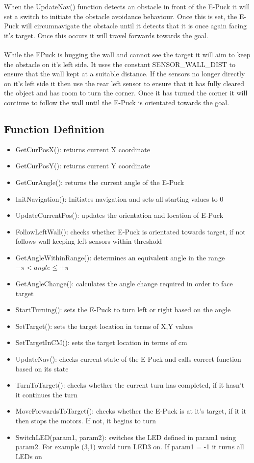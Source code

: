 \documentclass[11pt]{article}
\begin{document}
When the UpdateNav() function detects an obstacle in front of the E-Puck it will set a switch to initiate the obstacle avoidance behaviour. Once this is set, the E-Puck will circumnavigate the obstacle until it detects that it is once again facing it’s target. Once this occurs it will travel forwards towards the goal.
\\
\\
While the E\-Puck is hugging the wall and cannot see the target it will aim to keep the obstacle on it’s left side. It uses the constant SENSOR\_WALL\_DIST to ensure that the wall kept at a suitable distance. If the sensors no longer directly on it’s left side it then use the rear left sensor to ensure that it has fully cleared the object and has room to turn the corner. Once it has turned the corner it will continue to follow the wall until the E-Puck is orientated towards the goal.

\subsection*{Function Definition}

\begin{itemize}
\item{GetCurPosX(): returns current X coordinate}
\item{GetCurPosY(): returns current Y coordinate}
\item{GetCurAngle(): returns the current angle of the E-Puck}
\item{InitNavigation(): Initiates navigation and sets all starting values to 0}
\item{UpdateCurrentPos(): updates the orientation and location of E-Puck}
\item{FollowLeftWall(): checks whether E-Puck is orientated towards target, if not follows wall keeping left sensors within threshold}
\item{GetAngleWithinRange(): determines an equivalent angle in the range \begin{math}-\pi < angle \leq +\pi\end{math}}
\item{GetAngleChange(): calculates the angle change required in order to face target}
\item{StartTurning(): sets the E-Puck to turn left or right based on the angle}
\item{SetTarget(): sets the target location in terms of X,Y values}
\item{SetTargetInCM(): sets the target location in terms of cm}
\item{UpdateNav(): checks current state of the E-Puck and calls correct function based on its state}
\item{TurnToTarget(): checks whether the current turn has completed, if it hasn’t it continues the turn}
\item{MoveForwardsToTarget(): checks whether the E-Puck is at it’s target, if it it then stops the motors. If not, it begins to turn}
\item{SwitchLED(param1, param2): switches the LED defined in param1 using param2. For example (3,1) would turn LED3 on. If param1 = -1 it turns all LEDs on}
\end{itemize}
\end{document}
